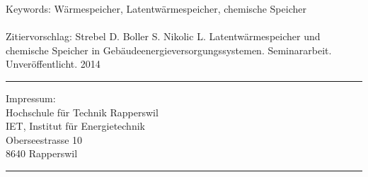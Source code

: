  \vspace*{12.5cm}
\begin{minipage}{80mm}
	Keywords: Wärmespeicher, Latentwärmespeicher, chemische Speicher
 \\
	\\
	Zitiervorschlag: 
	Strebel D. Boller S. Nikolic L. Latentwärmespeicher und chemische Speicher
in Gebäudeenergieversorgungssystemen. Seminararbeit. Unveröffentlicht. 2014
	\vspace{1cm}


  \rule{80mm}{2pt}
  Impressum: \\
  Hochschule für Technik Rapperswil \\
  IET, Institut für Energietechnik \\ 
  Oberseestrasse 10 \\
  8640 Rapperswil\\
  \rule{80mm}{2pt}
\end{minipage}
\newpage

